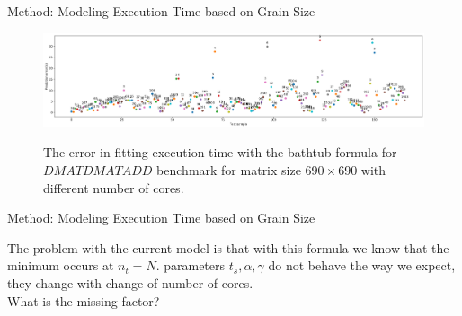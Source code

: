 \documentclass[10pt]{beamer}
\begin{document}
\begin{frame}{Method: Modeling Execution Time based on Grain Size}
	\begin{outline}	
\begin{figure}[]
		{\hfill\includegraphics[scale=.2]{images/bathtub/prediction_error_overall690.png}}	
	\caption{The error in fitting execution time with the bathtub formula for $DMATDMATADD$ benchmark for matrix size $690\times690$ with different number of cores.}	
	\label{fig25}
\end{figure}
\end{outline}
\end{frame}

\begin{frame}{Method: Modeling Execution Time based on Grain Size}
	\begin{outline}	
\1The problem with the current model is that with this formula we know that the minimum occurs at $n_t=N$.
\1parameters $t_s, \alpha, \gamma$ do not behave the way we expect, they change with change of number of cores.
\\
What is the missing factor?
\end{outline}
\end{frame}


\end{document}
